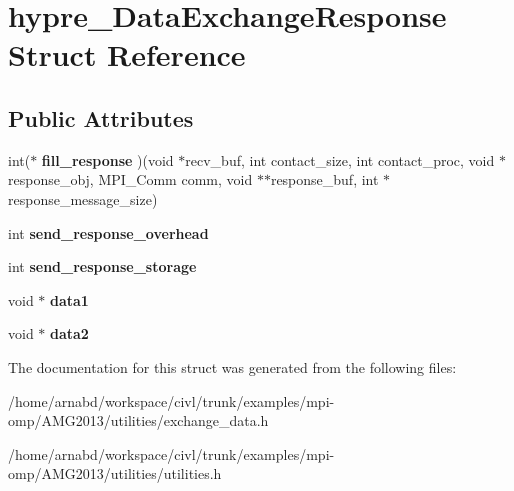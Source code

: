 \hypertarget{structhypre__DataExchangeResponse}{}\section{hypre\+\_\+\+Data\+Exchange\+Response Struct Reference}
\label{structhypre__DataExchangeResponse}
\subsection*{Public Attributes}
\begin{DoxyCompactItemize}
\item 
\hypertarget{structhypre__DataExchangeResponse_a4327929b375fc07a8092c1d13b050d6d}{}int($\ast$ {\bfseries fill\+\_\+response} )(void $\ast$recv\+\_\+buf, int contact\+\_\+size, int contact\+\_\+proc, void $\ast$response\+\_\+obj, M\+P\+I\+\_\+\+Comm comm, void $\ast$$\ast$response\+\_\+buf, int $\ast$response\+\_\+message\+\_\+size)\label{structhypre__DataExchangeResponse_a4327929b375fc07a8092c1d13b050d6d}

\item 
\hypertarget{structhypre__DataExchangeResponse_a2f9d739f0282b47b33f56aef4150481b}{}int {\bfseries send\+\_\+response\+\_\+overhead}\label{structhypre__DataExchangeResponse_a2f9d739f0282b47b33f56aef4150481b}

\item 
\hypertarget{structhypre__DataExchangeResponse_af3eaee9abb918275959dcc65d157f079}{}int {\bfseries send\+\_\+response\+\_\+storage}\label{structhypre__DataExchangeResponse_af3eaee9abb918275959dcc65d157f079}

\item 
\hypertarget{structhypre__DataExchangeResponse_a38643e8ede835c630ea92416fb7a8cd0}{}void $\ast$ {\bfseries data1}\label{structhypre__DataExchangeResponse_a38643e8ede835c630ea92416fb7a8cd0}

\item 
\hypertarget{structhypre__DataExchangeResponse_aedcaeb5a8d5ba0ffb1c898f7e2e98521}{}void $\ast$ {\bfseries data2}\label{structhypre__DataExchangeResponse_aedcaeb5a8d5ba0ffb1c898f7e2e98521}

\end{DoxyCompactItemize}


The documentation for this struct was generated from the following files\+:\begin{DoxyCompactItemize}
\item 
/home/arnabd/workspace/civl/trunk/examples/mpi-\/omp/\+A\+M\+G2013/utilities/exchange\+\_\+data.\+h\item 
/home/arnabd/workspace/civl/trunk/examples/mpi-\/omp/\+A\+M\+G2013/utilities/utilities.\+h\end{DoxyCompactItemize}
